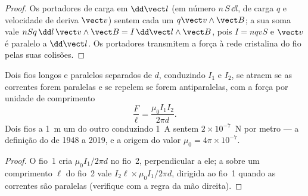 \begin{proof}
Os portadores de carga em $\dd\vect l$ (em número $n\,S\,\dd l$, de carga $q$ e
velocidade de deriva $\vect v$) sentem cada um $q\vect v\wedge\vect B$; a sua soma vale
$nSq\,\dd l\,\vect v\wedge\vect B = I\,\dd\vect l\wedge\vect B$, pois $I = nqvS$
e $\vect v$ é paralelo a $\dd\vect l$. Os portadores transmitem a força à
rede cristalina do fio pelas suas colisões.
\end{proof}

\begin{proposition}\label{prop:b1:magnetostatics:parallel}
Dois fios longos e paralelos separados de $d$, conduzindo $I_1$ e $I_2$,
se atraem se as correntes forem paralelas e se repelem se forem antiparalelas,
com a força por unidade de comprimento
\[
\frac{F}{\ell} = \frac{\mu_0I_1I_2}{2\pi d} .
\]
Dois fios a \qty{1}{m} um do outro conduzindo \qty{1}{A} sentem $2 \times 10^{-7}$~N por
metro --- a definição do  de 1948 a 2019, e a
origem do valor $\mu_0 = 4\pi \times 10^{-7}$.
\end{proposition}

\begin{proof}
O fio~1 cria $\mu_0I_1/2\pi d$ no fio~2, perpendicular a ele; a
 sobre um comprimento $\ell$ do fio~2 vale $I_2\ell \times \mu_0I_1/2\pi d$,
dirigida ao fio~1 quando as correntes são paralelas (verifique com a
regra da mão direita).
\end{proof}

